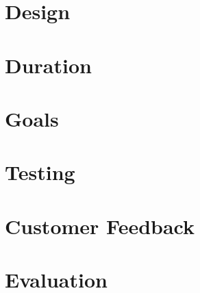 




\section{Design}
\section{Duration}
\section{Goals}
\section{Testing}
\section{Customer Feedback}
\section{Evaluation}